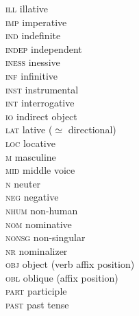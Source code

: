 \begin{refsection}
\begin{multicols}{2}
\begin{tabbing}
	\textsc{ill} \>  illative\\
	
	\textsc{imp} \>  imperative\\
	
	\textsc{ind} \>  indefinite\\
	
	\textsc{indep} \>  independent\\
	
	\textsc{iness} \>  inessive\\
	
	\textsc{inf} \>  infinitive\\
	
	\textsc{inst} \>  instrumental\\
	
	\textsc{int} \>  interrogative\\
	
	\textsc{io} \>  indirect object\\
	
	\textsc{lat} \>  lative (${\simeq}$ directional)\\
	
	\textsc{loc} \>  locative\\
	
	\textsc{m} \>  masculine\\
	
	\textsc{mid} \>  middle voice\\

	\textsc{n} \>  neuter\\
	
	\textsc{neg} \>  negative\\
		
	\textsc{nhum} \>  non-human\\
	
	\textsc{nom} \>  nominative\\
	
	\textsc{nonsg} \>  non-singular\\
	
	\textsc{nr} \>  nominalizer\\
	
	\textsc{obj} \>  object (verb affix position)\\
	
	\textsc{obl} \>  oblique (affix position)\\
	
	\textsc{part} \>  participle\\
	
	\textsc{past} \>  past tense\\
	

\end{tabbing}
\end{multicols}
\end{refsection}
